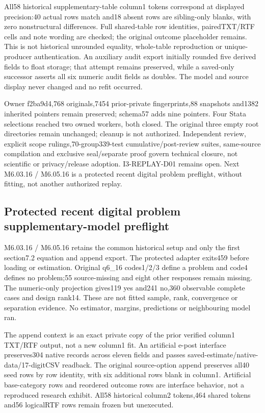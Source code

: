\documentclass[11pt,a4paper]{article}
\begin{document}
All58 historical supplementary-table column1 tokens correspond at displayed precision:40 actual rows match and18 absent rows are sibling-only blanks, with zero nonstructural differences. Full shared-table row identities, pairedTXT/RTF cells and note wording are checked; the original outcome placeholder remains. This is not historical unrounded equality, whole-table reproduction or unique-producer authentication. An auxiliary audit export initially rounded five derived fields to float storage; that attempt remains preserved, while a saved-only successor asserts all six numeric audit fields as doubles. The model and source display never changed and no refit occurred.

Owner f2ba9d4,768 originals,7454 prior-private fingerprints,88 snapshots and1382 inherited pointers remain preserved; schema57 adds nine pointers. Four Stata selections reached two owned workers, both closed. The original three empty root directories remain unchanged; cleanup is not authorized. Independent review, explicit scope rulings,70-group339-test cumulative/post-review suites, same-source compilation and exclusive seal/separate proof govern technical closure, not scientific or privacy/release adoption. I3-REPLAY-D01 remains open. Next M6.03.16 / M6.05.16 is a protected recent digital problem preflight, without fitting, not another authorized replay.

\subsection*{Protected recent digital problem supplementary-model preflight}

M6.03.16 / M6.05.16 retains the common historical setup and only the first section7.2 equation and append export. The protected adapter exits459 before loading or estimation. Original q6\_16 codes1/2/3 define a problem and code4 defines no problem;55 source-missing and eight other responses remain missing. The numeric-only projection gives119 yes and241 no,360 observable complete cases and design rank14. These are not fitted sample, rank, convergence or separation evidence. No estimator, margins, predictions or neighbouring model ran.

The append context is an exact private copy of the prior verified column1 TXT/RTF output, not a new column1 fit. An artificial e-post interface preserves304 native records across eleven fields and passes saved-estimate/native-data/17-digitCSV readback. The original source-option append preserves all40 seed rows by row identity, with six additional rows blank in column1. Artificial base-category rows and reordered outcome rows are interface behavior, not a reproduced research exhibit. All58 historical column2 tokens,464 shared tokens and56 logicalRTF rows remain frozen but unexecuted.
\end{document}
